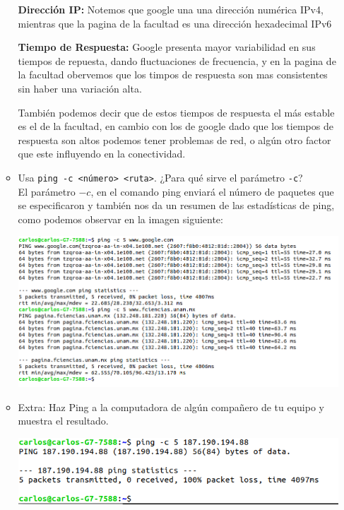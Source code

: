 \begin{itemize}
\begin{itemize}
        \textbf{Dirección IP:} Notemos que google una una dirección numérica IPv4, mientras que la pagina de la facultad es una dirección hexadecimal IPv6

        \textbf{Tiempo de Respuesta:} Google presenta mayor variabilidad en sus tiempos de repuesta, dando fluctuaciones de frecuencia, y en la pagina de la facultad obervemos que los timpos de respuesta son mas consistentes sin haber una variación alta.

        También podemos decir que de estos tiempos de respuesta el más estable es el de la facultad, en cambio con los de google dado que los tiempos de respuesta son altos podemos tener problemas de red, o algún otro factor que este influyendo en la conectividad.
        
        \item Usa \texttt{ping -c <número> <ruta>}. ¿Para qué sirve el parámetro \texttt{-c}?\\

        El parámetro $-c$, en el comando ping enviará el número de paquetes que se especificaron y también nos da un resumen de las estadísticas de ping, como podemos observar en la imagen siguiente:
        
        \begin{center}
            \includegraphics[width=12cm]{IMAGE/ping-c.png}
        \end{center}
        \item Extra: Haz Ping a la computadora de algún compañero de tu equipo y muestra el resultado.

        \begin{center}
            \includegraphics[width=12cm]{IMAGE/ping-computadora.png}
        \end{center}
    \end{itemize}


\end{itemize}
